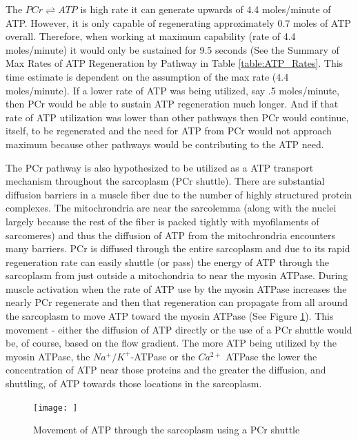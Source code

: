 The $PCr \rightleftharpoons ATP$ is high rate it can generate upwards of 4.4 moles/minute of ATP. However, it is only capable of regenerating approximately 0.7 moles of ATP overall. Therefore, when working at maximum capability (rate of 4.4 moles/minute) it would only be sustained for 9.5 seconds (See the Summary of Max Rates of ATP Regeneration by Pathway in Table \ref{table:ATP_Rates}. This time estimate is dependent on the assumption of the max rate (4.4 moles/minute). If a lower rate of ATP was being utilized, say .5 moles/minute, then PCr would be able to sustain ATP regeneration much longer. And if that rate of ATP utilization was lower than other pathways then PCr would continue, itself, to be regenerated and the need for ATP from PCr would not approach maximum because other pathways would be contributing to the ATP need.


The PCr pathway is also hypothesized to be utilized as a ATP transport mechanism throughout the sarcoplasm (PCr shuttle). There are substantial diffusion barriers in a muscle fiber due to the number of highly structured protein complexes. The mitochrondria are near the sarcolemma (along with the nuclei largely because the rest of the fiber is packed tightly with myofilaments of sarcomeres) and thus the diffusion of ATP from the mitochrondria encounters many barriers.  PCr is diffused through the entire sarcoplasm and due to its rapid regeneration rate can easily shuttle (or pass) the energy of ATP through the sarcoplasm from just outside a mitochondria to near the myosin ATPase. During muscle activation when the rate of ATP use by the myosin ATPase increases the nearly PCr regenerate and then that regeneration can propagate from all around the sarcoplasm to move ATP toward the myosin ATPase (See Figure \ref{fig:PCr}). This movement - either the diffusion of ATP directly or the use of a PCr shuttle would be, of course, based on the flow gradient. The more ATP being utilized by the myosin ATPase, the $Na^+/K^+$-ATPase or the $Ca^{2+}$ ATPase the lower the concentration of ATP near those proteins and the greater the diffusion, and shuttling, of ATP towards those locations in the sarcoplasm.

\begin{figure}[h!]
    \centering
    \texttt{[image: ]}
    \caption{Movement of ATP through the sarcoplasm using a PCr shuttle}
    \label{fig:PCr}
\end{figure}

